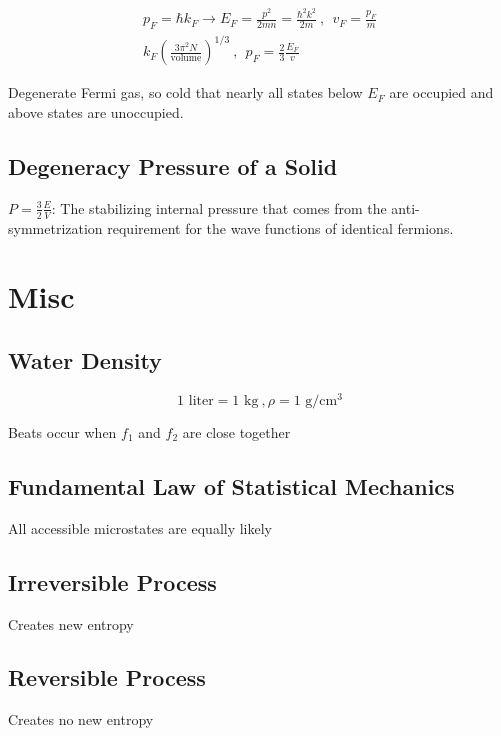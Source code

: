 \documentclass[10pt,letter]{article}
\begin{document}
\begin{align}
 p_F = \hbar k_F \rightarrow E_F = \frac{p^2}{2mn} = \frac{\hbar^2k^2}{2m}~,~~v_F = \frac{p_F}{m}\\
k_F \left( \frac{3\pi^2N}{\textrm{volume}} \right)^{1/3}~,~~p_F = \frac{2}{3}\frac{E_F}{v}
\end{align}

Degenerate Fermi gas, so cold that nearly all states below $E_F$ are occupied and above states are unoccupied. 

\subsection{Degeneracy Pressure of a Solid}
$P = \frac{3}{2}\frac{E}{V}$: The stabilizing internal pressure that comes from the anti-symmetrization requirement for the wave functions of identical fermions.


\section{Misc}
\subsection{Water Density}
\begin{equation}
 1 \textrm{ liter} = 1 \textrm{ kg}~, \rho = 1 \textrm{ g}/ \textrm{cm}^3
\end{equation}

Beats occur when $f_1$ and $f_2$ are close together

\subsection{Fundamental Law of Statistical Mechanics}
All accessible microstates are equally likely

\subsection{Irreversible Process}
Creates new entropy

\subsection{Reversible Process}
Creates no new entropy
\end{document}

